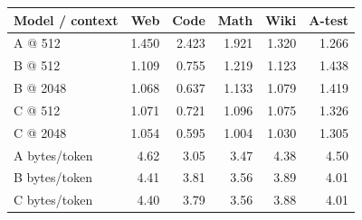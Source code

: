 \begin{tabular}{lrrrrr}
\toprule
Model / context & Web & Code & Math & Wiki & A-test \\
\midrule
A @ 512 & 1.450 & 2.423 & 1.921 & 1.320 & 1.266 \\
B @ 512 & 1.109 & 0.755 & 1.219 & 1.123 & 1.438 \\
B @ 2048 & 1.068 & 0.637 & 1.133 & 1.079 & 1.419 \\
C @ 512 & 1.071 & 0.721 & 1.096 & 1.075 & 1.326 \\
C @ 2048 & 1.054 & 0.595 & 1.004 & 1.030 & 1.305 \\
\midrule
A bytes/token & 4.62 & 3.05 & 3.47 & 4.38 & 4.50 \\
B bytes/token & 4.41 & 3.81 & 3.56 & 3.89 & 4.01 \\
C bytes/token & 4.40 & 3.79 & 3.56 & 3.88 & 4.01 \\
\bottomrule
\end{tabular}
